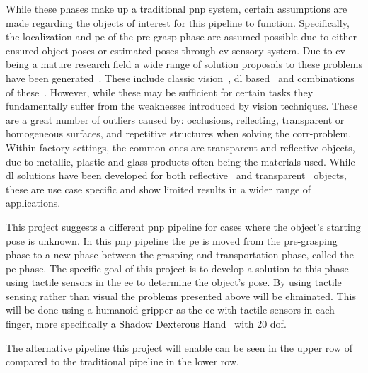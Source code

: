 While these phases make up a traditional \gls{pnp} system, certain assumptions are made regarding the objects of interest for this pipeline to function. Specifically, the localization and \gls{pe} of the pre-grasp phase are assumed possible due to either ensured object poses or estimated poses through \gls{cv} sensory system. Due to \gls{cv} being a mature research field a wide range of solution proposals to these problems have been generated~\cite{6d-pose-estimation-of-objects:-recent-technologies-and-challenges}. These include classic vision~\cite{3d-object-pose-estimation-using-stereo-vision-for-object-manipulation-system, stereo-vision-based-automation-for-a-bin-picking-solution}, \gls{dl} based~\cite{uncalibrated-stereo-vision-with-deep-learning-for-6-dof-pose-estimation-for-a-robot-arm-system} and combinations of these~\cite{stereo-vision-based-single-shot-6d-object-pose-estimation-for-bin-picking-by-a-robot-manipulator}. However, while these may be sufficient for certain tasks they fundamentally suffer from the weaknesses introduced by vision techniques. These are a great number of outliers caused by: occlusions, reflecting, transparent or homogeneous surfaces, and repetitive structures when solving the \gls{corr-problem}. Within factory settings, the common ones are transparent and reflective objects, due to metallic, plastic and glass products often being the materials used. While \gls{dl} solutions have been developed for both reflective~\cite{data-driven-object-pose-estimation-in-a-practical-bin-picking-application} and transparent~\cite{6dof-pose-estimation-of-transparent-object-from-a-single-rgb-d-image} objects, these are use case specific and show limited results in a wider range of applications. \medskip

This project suggests a different \gls{pnp} pipeline for cases where the object's starting pose is unknown. In this \gls{pnp} pipeline the \gls{pe} is moved from the pre-grasping phase to a new phase between the grasping and transportation phase, called the \gls{pe} phase. The specific goal of this project is to develop a solution to this phase using tactile sensors in the \gls{ee} to determine the object's pose. By using tactile sensing rather than visual the problems presented above will be eliminated. This will be done using a humanoid gripper as the \gls{ee} with tactile sensors in each finger, more specifically a Shadow Dexterous Hand~\cite{shadow-dex-hand} with \num{20} \gls{dof}. \medskip

The alternative pipeline this project will enable can be seen in the upper row of  compared to the traditional pipeline in the lower row.\medskip 

